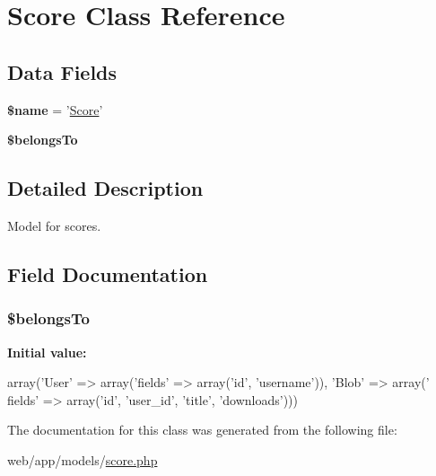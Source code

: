 \hypertarget{class_score}{
\section{Score Class Reference}
\label{class_score}
}
\subsection*{Data Fields}
\begin{DoxyCompactItemize}
\item 
\hypertarget{class_score_ab2fc40d43824ea3e1ce5d86dee0d763b}{
{\bfseries \$name} = '\hyperlink{class_score}{Score}'}
\label{class_score_ab2fc40d43824ea3e1ce5d86dee0d763b}

\item 
{\bfseries \$belongsTo}
\end{DoxyCompactItemize}


\subsection{Detailed Description}
Model for scores. 

\subsection{Field Documentation}
\hypertarget{class_score_a1578683643768f402aa354aabf0c1c31}{
\subsubsection[{\$belongsTo}]{\setlength{\rightskip}{0pt plus 5cm}\$belongsTo}}
\label{class_score_a1578683643768f402aa354aabf0c1c31}
{\bfseries Initial value:}
\begin{DoxyCode}
 array('User' => array('fields' => array('id', 'username')), 
                                                                'Blob' => array('
      fields' => array('id', 'user_id', 'title', 'downloads')))
\end{DoxyCode}


The documentation for this class was generated from the following file:\begin{DoxyCompactItemize}
\item 
web/app/models/\hyperlink{score_8php}{score.php}\end{DoxyCompactItemize}
